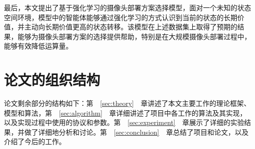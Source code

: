 最后，本文提出了基于强化学习的摄像头部署方案选择模型，面对一个未知的状态空间环境，模型中的智能体能够通过强化学习的方式认识到当前的状态的长期价值，并主动向长期价值更高的状态转移。该模型在上述数据集上取得了预期的结果，能够为摄像头部署方案的选择提供帮助，特别是在大规模摄像头部署过程中，能够有效降低运算量。

\section{论文的组织结构}

论文剩余部分的结构如下：第~~\ref{sec:theory}~~章讲述了本文主要工作的理论框架、模型和算法，第~~\ref{sec:algorithm}~~章详细讲述了项目中各工作的算法及其实现，以及实现过程中使用的协议和参数。第~~\ref{sec:experiment}~~章展示了详细的实验结果，并做了详细地分析和讨论。第~~\ref{sec:conclusion}~~章总结了项目和论文，以及介绍了今后的工作。